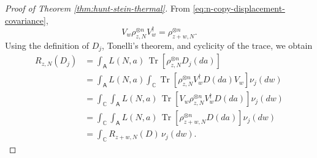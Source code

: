 \documentclass{article}
\theoremstyle{named}
\theoremstyle{named1}
\newcommand{\Tr}{\operatorname{Tr}}
\newcommand{\bbC}{\mathbb C}
\theoremstyle{plain}
\theoremstyle{remark}
\begin{document}
\begin{proof}[Proof of Theorem \ref{thm:hunt-stein-thermal}]
From \eqref{eq:n-copy-displacement-covariance},
\begin{equation}
    V_w
    \rho_{z,N}^{\otimes n}
    V_w^\dagger
    =
    \rho_{z+w,N}^{\otimes n}.
    \label{eq:risk-covariance}
\end{equation}
Using the definition of \(D_j\), Tonelli's theorem, and cyclicity of the
trace, we obtain
\begin{align}
    R_{z,N}(D_j)
    &=
    \int_{\mathsf A}
        L(N,a)\,
        \Tr\!\left[
            \rho_{z,N}^{\otimes n}
            D_j(da)
        \right]
    \nonumber\\
    &=
    \int_{\mathsf A}
        L(N,a)
        \int_{\bbC}
            \Tr\!\left[
                \rho_{z,N}^{\otimes n}
                V_w^\dagger D(da)V_w
            \right]
            \nu_j(dw)
    \nonumber\\
    &=
    \int_{\bbC}
        \int_{\mathsf A}
            L(N,a)\,
            \Tr\!\left[
                V_w
                \rho_{z,N}^{\otimes n}
                V_w^\dagger
                D(da)
            \right]
        \nu_j(dw)
    \nonumber\\
    &=
    \int_{\bbC}
        \int_{\mathsf A}
            L(N,a)\,
            \Tr\!\left[
                \rho_{z+w,N}^{\otimes n}
                D(da)
            \right]
        \nu_j(dw)
    \nonumber\\
    &=
    \int_{\bbC}
        R_{z+w,N}(D)\,
        \nu_j(dw).
    \label{eq:averaged-risk-identity}
\end{align}


\end{proof}
\end{document}
